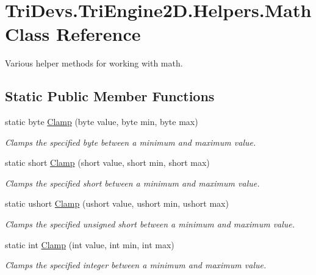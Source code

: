 \hypertarget{class_tri_devs_1_1_tri_engine2_d_1_1_helpers_1_1_math}{\section{Tri\-Devs.\-Tri\-Engine2\-D.\-Helpers.\-Math Class Reference}
\label{class_tri_devs_1_1_tri_engine2_d_1_1_helpers_1_1_math}
}


Various helper methods for working with math.  


\subsection*{Static Public Member Functions}
\begin{DoxyCompactItemize}
\item 
static byte \hyperlink{class_tri_devs_1_1_tri_engine2_d_1_1_helpers_1_1_math_a6fc0a6bb51ff9dc19de296e44d410714}{Clamp} (byte value, byte min, byte max)
\begin{DoxyCompactList}\small\item\em Clamps the specified byte between a minimum and maximum value. \end{DoxyCompactList}\item 
static short \hyperlink{class_tri_devs_1_1_tri_engine2_d_1_1_helpers_1_1_math_a0cbf700705a6a400092a11d8b6cd10e4}{Clamp} (short value, short min, short max)
\begin{DoxyCompactList}\small\item\em Clamps the specified short between a minimum and maximum value. \end{DoxyCompactList}\item 
static ushort \hyperlink{class_tri_devs_1_1_tri_engine2_d_1_1_helpers_1_1_math_abc3481fdae505fc0c826c254a4e919ff}{Clamp} (ushort value, ushort min, ushort max)
\begin{DoxyCompactList}\small\item\em Clamps the specified unsigned short between a minimum and maximum value. \end{DoxyCompactList}\item 
static int \hyperlink{class_tri_devs_1_1_tri_engine2_d_1_1_helpers_1_1_math_a20b975f6c75f2b30e54c6051a7d363df}{Clamp} (int value, int min, int max)
\begin{DoxyCompactList}\small\item\em Clamps the specified integer between a minimum and maximum value. \end{DoxyCompactList}\item 

\end{DoxyCompactItemize}
